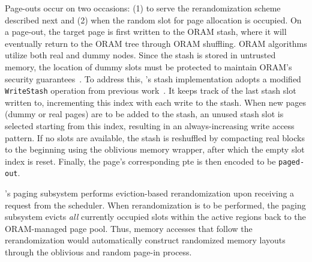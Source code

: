 \label{subsubsec:page-out}
Page-outs occur on two occasions: (1) to serve the rerandomization scheme described next and (2) when the random slot for page allocation is occupied.
On a page-out, the target page is first written to the ORAM stash, where it will eventually return to the ORAM tree through ORAM shuffling.
ORAM algorithms utilize both real and dummy nodes.
Since the stash is stored in untrusted memory, the location of dummy slots must be protected to maintain ORAM's security guarantees~\cite{zhang2020klotski}.
To address this, \thename's stash implementation adopts a modified \texttt{WriteStash} operation from previous work~\cite{zhang2020klotski}.
It keeps track of the last stash slot written to, incrementing this index with each write to the stash.
When new pages (dummy or real pages) are to be added to the stash, an unused stash slot is selected starting from this index, resulting in an always-increasing write access pattern.
If no slots are available, the stash is reshuffled by compacting real blocks to the beginning using the oblivious memory wrapper, after which the empty slot index is reset.
Finally, the page's corresponding \gls{pte} is then encoded to be \texttt{paged-out}.



\thename's paging subsystem performs eviction-based rerandomization upon receiving a request from the scheduler.
When rerandomization is to be performed, the paging subsystem evicts \emph{all} currently occupied slots within the active regions back to the ORAM-managed page pool.
Thus, memory accesses that follow the rerandomization would automatically construct randomized memory layouts through the oblivious and random page-in process.


